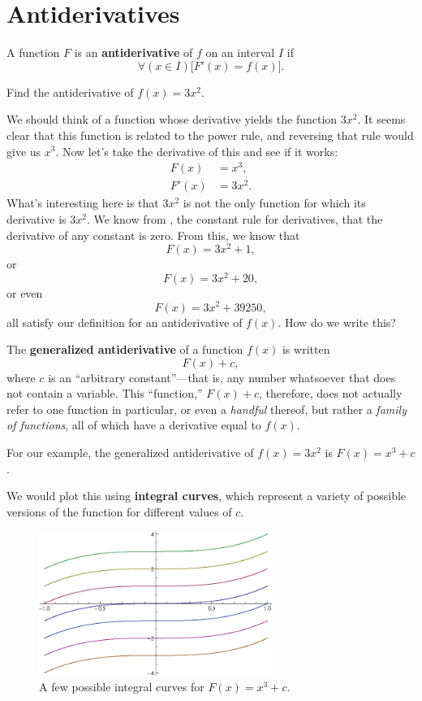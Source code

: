 \section{Antiderivatives}
\begin{defn}
  A function $F$ is an \textbf{antiderivative} of $f$ on an interval $I$ if
  \begin{equation}
      \forall (x \in I) \big[F'(x)=f(x)\big].
  \end{equation}
\end{defn}
\begin{ex}
  Find the antiderivative of $f(x)=3x^2$.
  \begin{sol}
    We should think of a function whose derivative yields the function $3x^2$.
    It seems clear that this function is related to the power rule, and reversing that rule would give us $x^3$.
    Now let's take the derivative of this and see if it works:
    \begin{align*}
      F(x)&=x^3, \\
      F'(x) &= 3x^2.
    \end{align*}
    What's interesting here is that $3x^2$ is not the only function for which its derivative is $3x^2$.
    We know from , the constant rule for derivatives, that the derivative of any constant is zero.
    From this, we know that
    \[ F(x)=3x^2+1, \]
    or
    \[ F(x)=3x^2+20,\]
    or even
    \[ F(x)=3x^2+39250,\]
    all satisfy our definition for an antiderivative of $f(x)$.
    How do we write this?

    \begin{defn}
        The \textbf{generalized antiderivative} of a function $f(x)$ is written
        \begin{equation}
            F(x)+c,
        \end{equation}
        where $c$ is an ``arbitrary constant''---that is, any number whatsoever that does not contain a variable.
        This ``function,'' $F(x)+c$, therefore, does not actually refer to one function in particular,
        or even a \emph{handful} thereof, but rather a \emph{family of functions}, all of which have a derivative equal to $f(x)$.
    \end{defn}

    For our example, the generalized antiderivative of $f(x)=3x^2$ is $F(x)=x^3+c$.
  \end{sol}
\end{ex}
We would plot this using \textbf{integral curves}, which represent a variety of possible versions of the function for different values of $c$.
\begin{figure}[<+htpb+>]
  \begin{center}
    \includegraphics[width=3in]{continuous/derivatives/intcurves.eps}
  \end{center}
  \caption{A few possible integral curves for $F(x)=x^3+c$.}
\end{figure}
